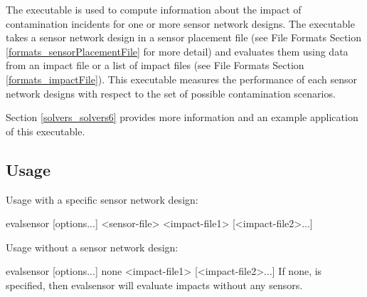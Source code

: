 The  executable is used to compute information about the impact 
of contamination incidents for one or more sensor network designs. The  
executable takes a sensor network design in a sensor placement file (see File Formats Section 
\ref{formats_sensorPlacementFile} for more detail) and evaluates them using data from 
an impact file or a list of impact files (see File Formats Section \ref{formats_impactFile}). 
This executable measures the performance of each sensor network designs with respect 
to the set of possible contamination scenarios.

Section \ref{solvers_solvers6} provides more information and an example application of 
this executable.

\subsection{Usage}\label{evalsensorExecutable_evalsensorUsage}
Usage with a specific sensor network design:
\begin{unknownListing}
   evalsensor [options...] <sensor-file> <impact-file1> [<impact-file2>...]
\end{unknownListing}
Usage without a sensor network design:
\begin{unknownListing}
   evalsensor [options...] none <impact-file1> [<impact-file2>...]
If none, is specified, then evalsensor will evaluate impacts without any sensors.
\end{unknownListing}

